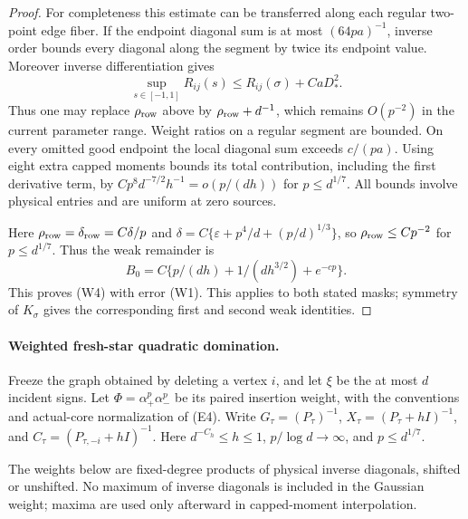 \documentclass[10pt]{article}
\numberwithin{equation}{section}
\newcommand{\1}{\mathbf1}
\begin{document}
\begin{proof}
For completeness this estimate can be transferred along each regular
two-point edge fiber. If the endpoint diagonal sum is at most
$(64pa)^{-1}$, inverse order bounds every diagonal along the segment
by twice its endpoint value. Moreover inverse differentiation gives
\[
 \sup_{s\in[-1,1]}R_{ij}(s)
 \le R_{ij}(\sigma)+CaD_*^2.
\]
Thus one may replace $\rho_{\rm row}$ above by
$\rho_{\rm row}+d^{-1}$, which remains $O(p^{-2})$ in the current
parameter range. Weight ratios on a regular segment are bounded.
On every omitted good endpoint the local diagonal sum exceeds
$c/(pa)$. Using eight extra capped moments bounds its total
contribution, including the first derivative term, by
$Cp^8d^{-7/2}h^{-1}=o(p/(dh))$ for $p\le d^{1/7}$.
All bounds involve physical entries and are uniform at zero sources.

Here $\rho_{\rm row}=\delta_{\rm row}=C\delta/p$ and
$\delta=C\{\varepsilon+p^4/d+(p/d)^{1/3}\}$, so
$\rho_{\rm row}\le Cp^{-2}$ for $p\le d^{1/7}$.
Thus the weak remainder is
\[
 B_0=C\{p/(dh)+1/(dh^{3/2})+e^{-cp}\}.
\]
This proves (W4) with error (W1).
This applies to both stated masks; symmetry of $K_\sigma$ gives
the corresponding first and second weak identities.
\end{proof}

\paragraph{Weighted fresh-star quadratic domination.}
Freeze the graph obtained by deleting a vertex $i$, and let $\xi$ be
the at most $d$ incident signs.  Let $\Phi=\alpha_+^p\alpha_-^p$
be its paired insertion weight, with the conventions and actual-core
normalization of (E4).  Write $G_\tau=(P_\tau)^{-1}$,
$X_\tau=(P_\tau+hI)^{-1}$, and
$C_\tau=(P_{\tau,-i}+hI)^{-1}$.
Here $d^{-C_h}\le h\le1$, $p/\log d\to\infty$, and $p\le d^{1/7}$.

The weights below are fixed-degree products of physical inverse
diagonals, shifted or unshifted. No maximum of inverse diagonals
is included in the Gaussian weight; maxima are used only afterward
in capped-moment interpolation.
\end{document}
